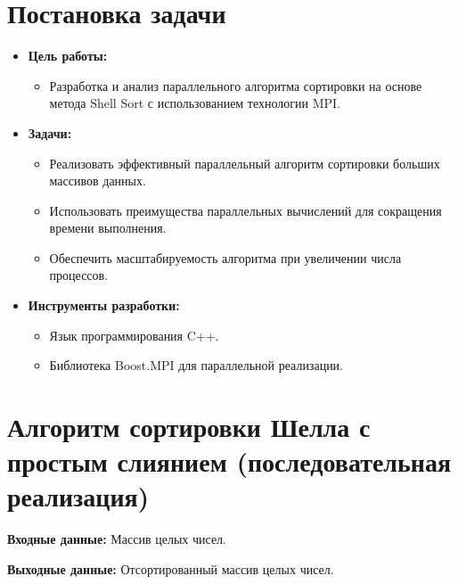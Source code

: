 \documentclass[12pt]{article}
\begin{document}
\section*{Постановка задачи}
\begin{itemize}
    \item \textbf{Цель работы:}
        \begin{itemize}
            \item Разработка и анализ параллельного алгоритма сортировки на основе метода Shell Sort с использованием технологии MPI.
        \end{itemize}
    \item \textbf{Задачи:}
        \begin{itemize}
            \item Реализовать эффективный параллельный алгоритм сортировки больших массивов данных.
            \item Использовать преимущества параллельных вычислений для сокращения времени выполнения.
            \item Обеспечить масштабируемость алгоритма при увеличении числа процессов.
        \end{itemize}
    \item \textbf{Инструменты разработки:}
        \begin{itemize}
            \item Язык программирования C++.
            \item Библиотека Boost.MPI для параллельной реализации.
        \end{itemize}
\end{itemize}

\section*{Алгоритм сортировки Шелла с простым слиянием (последовательная реализация)}
\textbf{Входные данные:} Массив целых чисел.

\textbf{Выходные данные:} Отсортированный массив целых чисел.
\end{document}
